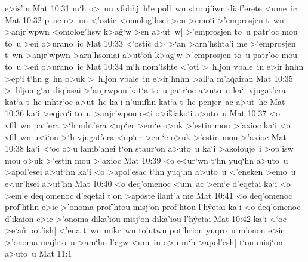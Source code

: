 e>is'in\bibvsend
\vs Mat 10:31
m`h
o>~un
vfobhj~h\r{t}e
poll~wn
strouj'iwn
diaf'erete
<ume~ic\bibvsend
\vs Mat 10:32
p~ac
o>~un
<'ostic
<omolog'hsei
>en
>emo`i
>'emprosjen
t~wn
>anjr'wpwn
<omolog'hsw
k>a\r{g}`w
>en
a>ut~w|
>'emprosjen
to~u
patr'oc
mou
to~u
>e\r{n}
o>urano~ic\bibvsend
\vs Mat 10:33
<'ostic\r{}
d>
>`an
>arn'hshta'i
me
>'emprosjen
t~wn
>anjr'wpwn
>arn'hsomai
a>ut`on\r{}
k>ag`w
>'emprosjen
to~u
patr'oc
mou
to~u
>e\r{n}
o>urano~ic\bibvsend
\vs Mat 10:34
m`h
nom'ishte
<'oti
>~hljon
vbale~in
e>ir'hnhn
>ep`i
t`hn
g~hn
o>uk
>~hljon
vbale~in
e>ir'hnhn
>all`a
m'a\r{q}airan\bibvsend
{}
\vs Mat 10:35
>~hljon
g`ar
diq'asai
>'anjrwpon
kat`a
to~u
patr`oc
a>uto~u
ka`i
vjugat'era
kat`a
t~hc
mhtr`oc
a>ut~hc
ka`i
n'umfhn
kat`a
t~hc
penjer~ac
a>ut~hc\bibvsend
\vs Mat 10:36
ka`i
>eqjro`i
to~u
>anjr'wpou
o<i
o>i\r{k}iako`i
a>uto~u\bibvsend
\vs Mat 10:37
<o
vfil~wn
pat'era
>`h
mht'era
<up`er
>em`e
o>uk
>'estin
mou
>'axioc
ka`i
<o
vfil~wn
u<i`on
>`h
vjugat'era
<up`er
>em`e
o>uk
>'estin
mou
>'axioc\bibvsend
\vs Mat 10:38
ka`i
<`oc
o>u
lamb'anei
t`on
staur`on
a>uto~u
ka`i
>akolouje~i
>op'isw
mou
o>uk
>'estin
mou
>'axioc\bibvsend
\vs Mat 10:39
<o
e<ur`wn
t`hn
yuq`hn
a>uto~u
>apol'esei
a>ut`hn
ka`i
<o
>apol'esac
t`hn
yuq`hn
a>uto~u
<'eneken
>emo~u
e<ur'hsei
a>ut'hn\bibvsend
\vs Mat 10:40
<o
deq'omenoc
<um~ac
>em`e
d'eqetai
ka`i
<o
>em`e
deq'omenoc
d'eqetai
t`on
>aposte'ilant'a
me\bibvsend
\vs Mat 10:41
<o
deq'omenoc
prof'hthn
e>ic
>'onoma
prof'htou
misj`on
prof'htou
l'h\r{y}etai
ka`i
<o
deq'omenoc
d'ikaion
e>ic
>'onoma
dika'iou
misj`on
dika'iou
l'h\r{y}etai\bibvsend
\vs Mat 10:42
ka`i
<`oc
>e`a\r{n}
pot'ish|
<'ena
t~wn
mikr~wn
to'utwn
pot'hrion
yuqro~u
m'onon
e>ic
>'onoma
majhto~u
>am`hn
l'egw
<um~in
o>u
m`h
>apol'esh|
t`on
misj`on
a>uto~u\bibvsend
\vs Mat 11:1

